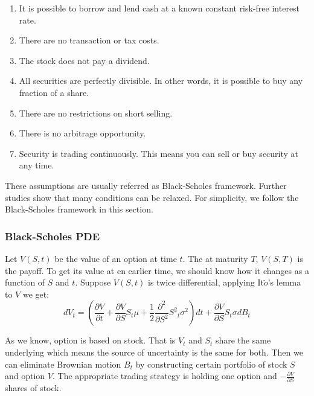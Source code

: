 \documentclass[11pt]{book}
\begin{document}
\begin{enumerate}[1.]
\item It is possible to borrow and lend cash at a known constant risk-free interest rate.
\item There are no transaction or tax costs.
\item The stock does not pay a dividend.
\item All securities are perfectly divisible. In other words, it is possible to buy any fraction of a share.
\item There are no restrictions on short selling.
\item There is no arbitrage opportunity.
\item Security is trading continuously. This means you can sell or buy security at any time.
\end{enumerate}

These assumptions are usually referred as Black-Scholes framework. Further studies show that many conditions can be relaxed. For simplicity, we follow the Black-Scholes framework in this section.


\subsubsection{Black-Scholes PDE}
Let $V(S, t)$ be the value of an option at time $t$. The at maturity $T$, $V(S,T)$ is the payoff. To get its value at en earlier time, we should know how it changes as a function of $S$ and $t$. Suppose $V(S,t)$ is twice differential, applying It$\breve{o}$'s lemma to $V$ we get:
\begin{equation}\label{ito}
dV_t = ( \frac{\partial V}{\partial t} + \frac{\partial V}{\partial S} S_t \mu + \frac{1}{2}\frac{{\partial}^2}{\partial S^2} {S^2}_t {\sigma}^2 ) dt + \frac{\partial V}{\partial S} S_t \sigma d B_t
\end{equation}

As we know, option is based on stock. That is $V_t$ and $S_t$ share the same underlying which means the source of uncertainty is the same for both. Then we can eliminate Brownian motion $B_t$ by constructing certain portfolio of stock $S$ and option $V$. The appropriate trading strategy is holding one option and $ -\frac{\partial V}{\partial S}$ shares of stock.
\end{document}
